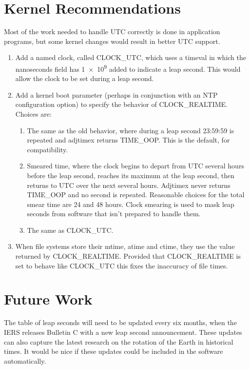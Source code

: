 \documentclass[letterpaper,twoside]{article}
\begin{document}
\section{Kernel Recommendations}
\label{section:KernelRecommendations}
Most of the work needed to handle UTC correctly is done in application
programs, but some kernel changes would result in better UTC support.
\begin{enumerate}
\item Add a named clock, called {\ttfamily CLOCK\_UTC}, which uses
  a {\ttfamily timeval} in which the nanoseconds field has
  \num[retain-unity-mantissa = false]{1e9} added to
  indicate a leap second.  This would allow the clock to be set
  during a leap second.
\item Add a kernel boot parameter (perhaps in conjunction with
  an NTP configuration option) to specify the behavior of
  {\ttfamily CLOCK\_REALTIME}.
  Choices are:
  \begin{enumerate}
  \item The same as the old behavior, where during a leap second
    23:59:59 is repeated and {\ttfamily adjtimex} returns
    {\ttfamily TIME\_OOP}.  This is the default, for compatibility.
  \item Smeared time, where the clock begins to depart from UTC several hours
    before the leap second, reaches its maximum at the leap second, then
    returns to UTC over the next several hours.  {\ttfamily Adjtimex}
    never returns {\ttfamily TIME\_OOP} and no second is repeated.
    Reasonable choices for the total smear time are 24 and 48 hours.
    Clock smearing is used to mask leap seconds from software that isn't
    prepared to handle them.
  \item The same as {\ttfamily CLOCK\_UTC}.
  \end{enumerate}
\item When file systems store their mtime, atime and ctime, they use
  the value returned by {\ttfamily CLOCK\_REALTIME}.  Provided that
  {\ttfamily CLOCK\_REALTIME} is set to behave like {\ttfamily CLOCK\_UTC}
  this fixes the inaccuracy of file times.
\end{enumerate}

\section{Future Work}
The table of leap seconds will need to be updated every six months,
when the IERS releases Bulletin C with a new leap second announcement.
These updates can also capture the latest research on the rotation
of the Earth in historical times.  It would be nice if these updates
could be included in the software automatically.
\end{document}
